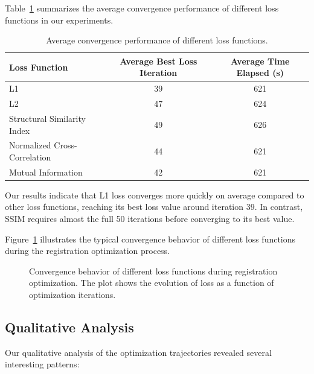 Table~\ref{tab:loss_convergence} summarizes the average convergence performance of different loss functions in our experiments.

\begin{table}[htpb]
  \caption[Convergence performance of different loss functions]{Average convergence performance of different loss functions.}\label{tab:loss_convergence}
  \centering
  \begin{tabular}{l c c}
    \toprule
      Loss Function & Average Best Loss Iteration & Average Time Elapsed (s) \\
    \midrule
      L1 & 39 & 621 \\
      L2 & 47 & 624 \\
      Structural Similarity Index & 49 & 626 \\
      Normalized Cross-Correlation & 44 & 621 \\
      Mutual Information & 42 & 621 \\
    \bottomrule
  \end{tabular}
\end{table}

Our results indicate that L1 loss converges more quickly on average compared to other loss functions, reaching its best loss value around iteration 39. In contrast, SSIM requires almost the full 50 iterations before converging to its best value.

Figure~\ref{fig:loss_convergence} illustrates the typical convergence behavior of different loss functions during the registration optimization process.

\begin{figure}[htpb]
  \centering
  \caption[Convergence behavior of different loss functions]{Convergence behavior of different loss functions during registration optimization. The plot shows the evolution of loss as a function of optimization iterations.}
  \label{fig:loss_convergence}
\end{figure}

\subsection{Qualitative Analysis}

Our qualitative analysis of the optimization trajectories revealed several interesting patterns:

